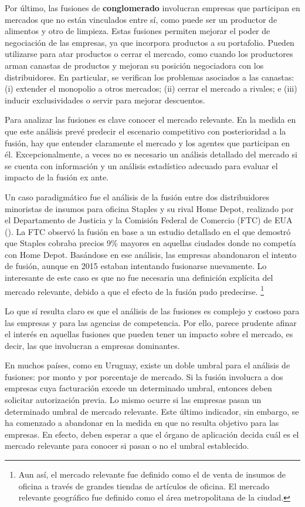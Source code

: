 \documentclass[
  12pt,
  spanish,
]{book}
\begin{document}
Por último, las fusiones de \textbf{conglomerado} involucran empresas
que participan en mercados que no están vinculados entre sí, como puede
ser un productor de alimentos y otro de limpieza. Estas fusiones
permiten mejorar el poder de negociación de las empresas, ya que
incorpora productos a su portafolio. Pueden utilizarse para atar
productos o cerrar el mercado, como cuando los productores arman
canastas de productos y mejoran su posición negociadora con los
distribuidores. En particular, se verifican los problemas asociados a
las canastas: (i) extender el monopolio a otros mercados; (ii) cerrar el
mercado a rivales; e (iii) inducir exclusividades o servir para mejorar
descuentos.

Para analizar las fusiones es clave conocer el mercado relevante. En la
medida en que este análisis prevé predecir el escenario competitivo con
posterioridad a la fusión, hay que entender claramente el mercado y los
agentes que participan en él. Excepcionalmente, a veces no es necesario
un análisis detallado del mercado si se cuenta con información y un
análisis estadístico adecuado para evaluar el impacto de la fusión ex
ante.

Un caso paradigmático fue el análisis de la fusión entre dos
distribuidores minoristas de insumos para oficina Staples y su rival
Home Depot, realizado por el Departamento de Justicia y la Comisión
Federal de Comercio (FTC) de EUA (\citet{Baker1999}). La FTC observó la
fusión en base a un estudio detallado en el que demostró que Staples
cobraba precios 9\% mayores en aquellas ciudades donde no competía con
Home Depot. Basándose en ese análisis, las empresas abandonaron el
intento de fusión, aunque en 2015 estaban intentando fusionarse
nuevamente. Lo interesante de este caso es que no fue necesaria una
definición explícita del mercado relevante, debido a que el efecto de la
fusión pudo predecirse. \footnote{Aun así, el mercado relevante fue
  definido como el de venta de insumos de oficina a través de grandes
  tiendas de artículos de oficina. El mercado relevante geográfico fue
  definido como el área metropolitana de la ciudad.}

Lo que sí resulta claro es que el análisis de las fusiones es complejo y
costoso para las empresas y para las agencias de competencia. Por ello,
parece prudente afinar el interés en aquellas fusiones que pueden tener
un impacto sobre el mercado, es decir, las que involucran a empresas
dominantes.

En muchos países, como en Uruguay, existe un doble umbral para el
análisis de fusiones: por monto y por porcentaje de mercado. Si la
fusión involucra a dos empresas cuya facturación excede un determinado
umbral, entonces deben solicitar autorización previa. Lo mismo ocurre si
las empresas pasan un determinado umbral de mercado relevante. Este
último indicador, sin embargo, se ha comenzado a abandonar en la medida
en que no resulta objetivo para las empresas. En efecto, deben esperar a
que el órgano de aplicación decida cuál es el mercado relevante para
conocer si pasan o no el umbral establecido.
\end{document}

